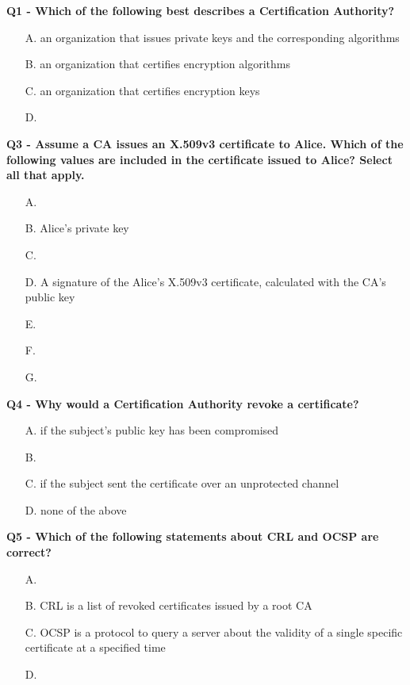 \textbf{Q1 - Which of the following best describes a Certification Authority?}
\begin{enumerate}
    \item[A.] an organization that issues private keys and the corresponding algorithms
    \item[B.] an organization that certifies encryption algorithms
    \item[C.] an organization that certifies encryption keys
    \item[D.] 
\end{enumerate}

\textbf{Q3 - Assume a CA issues an X.509v3 certificate to Alice. Which of the following values are included in the certificate issued to Alice? Select all that apply.}
\begin{itemize}
    \item[A.] 
    \item[B.] Alice’s private key
    \item[C.] 
    \item[D.] A signature of the Alice’s X.509v3 certificate, calculated with the CA’s public key
    \item[E.] 
    \item[F.] 
    \item[G.] 
\end{itemize}

\textbf{Q4 - Why would a Certification Authority revoke a certificate?}
\begin{enumerate}
    \item[A.] if the subject’s public key has been compromised
    \item[B.] 
    \item[C.] if the subject sent the certificate over an unprotected channel
    \item[D.] none of the above
\end{enumerate}

\textbf{Q5 - Which of the following statements about CRL and OCSP are correct?}
\begin{enumerate}
    \item[A.] 
    \item[B.] CRL is a list of revoked certificates issued by a root CA
    \item[C.] OCSP is a protocol to query a server about the validity of a single specific certificate at a specified time
    \item[D.] 
\end{enumerate}

